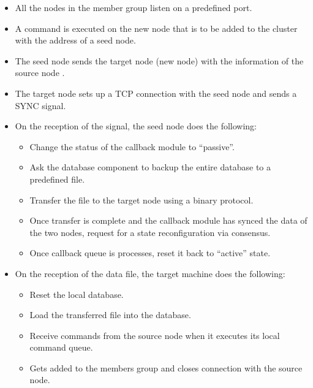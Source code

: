 \begin{itemize}
  \item All the nodes in the member group listen on a predefined port.
  \item A command is executed on the new node that is to be added to the cluster
    with the address of a seed%
     node.
  \item The seed node sends the target node (new node) with the information of
    the source node%
    .
  \item The target node sets up a TCP connection with the seed node and sends
    a SYNC%
     signal.
  \item On the reception of the signal, the seed node does the following:
    \begin{itemize}
      \item Change the status of the callback module to ``passive''.
      \item Ask the database component to backup the entire database to a
        predefined file.
      \item Transfer the file to the target node using a binary protocol.
      \item Once transfer is complete and the callback module has synced
        the data of the two nodes, request for a state reconfiguration via
        consensus.
      \item Once callback queue is processes, reset it back to ``active'' state.
    \end{itemize}
  \item On the reception of the data file, the target machine does the
    following:
    \begin{itemize}
      \item Reset the local database.
      \item Load the transferred file into the database.
      \item Receive commands from the source node when it executes its local
        command queue.
      \item Gets added to the members group and closes connection with the
        source node.
    \end{itemize}
\end{itemize}

